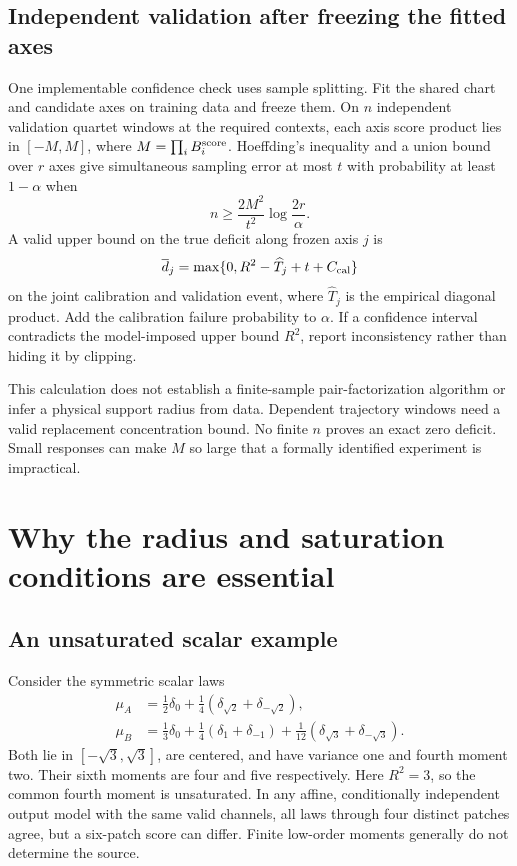 \documentclass[11pt]{article}
\theoremstyle{definition}
\theoremstyle{remark}
\begin{document}
\subsection{Independent validation after freezing the fitted axes}

One implementable confidence check uses sample splitting. Fit the shared
chart and candidate axes on training data and freeze them. On $n$
independent validation quartet windows at the required contexts, each
axis score product lies in $[-M,M]$, where
$M=\prod_i B_i^{\rm score}$. Hoeffding's inequality and a union bound over
$r$ axes give simultaneous sampling error at most $t$ with probability
at least $1-\alpha$ when
\begin{equation}
n\ge\frac{2M^2}{t^2}\log\frac{2r}{\alpha}.
\label{eq:saturation-hoeffding}
\end{equation}
A valid upper bound on the true deficit along frozen axis $j$ is
\begin{equation}
\overline d_j=
\max\{0,R^2-\widehat T_j+t+C_{\rm cal}\}
\label{eq:deficit-confidence}
\end{equation}
on the joint calibration and validation event, where $\widehat T_j$ is
the empirical diagonal product. Add the calibration failure probability
to $\alpha$. If a confidence interval contradicts the model-imposed upper
bound $R^2$, report inconsistency rather than hiding it by clipping.

This calculation does not establish a finite-sample pair-factorization
algorithm or infer a physical support radius from data. Dependent
trajectory windows need a valid replacement concentration bound. No
finite $n$ proves an exact zero deficit. Small responses can make $M$ so
large that a formally identified experiment is impractical.

\section{Why the radius and saturation conditions are essential}
\label{sec:counterexamples}

\subsection{An unsaturated scalar example}

Consider the symmetric scalar laws
\begin{align*}
\mu_A&=\tfrac12\delta_0+
\tfrac14(\delta_{\sqrt2}+\delta_{-\sqrt2}),\\
\mu_B&=\tfrac13\delta_0+
\tfrac14(\delta_1+\delta_{-1})+
\tfrac1{12}(\delta_{\sqrt3}+\delta_{-\sqrt3}).
\end{align*}
Both lie in $[-\sqrt3,\sqrt3]$, are centered, and have variance one and
fourth moment two. Their sixth moments are four and five respectively.
Here $R^2=3$, so the common fourth moment is unsaturated. In any affine,
conditionally independent output model with the same valid channels,
all laws through four distinct patches agree, but a six-patch score can
differ. Finite low-order moments generally do not determine the source.
\end{document}
